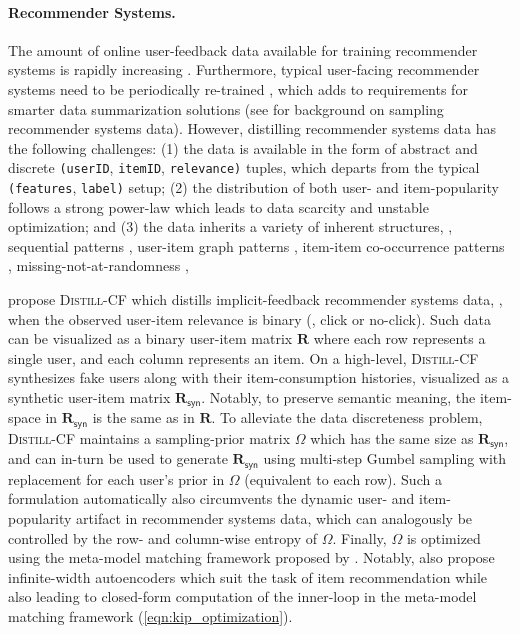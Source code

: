 \documentclass[10pt]{article} %
\begin{document}
\paragraph{Recommender Systems.} The amount of online user-feedback data available for training recommender systems is rapidly increasing \citep{data_increasing_recsys}.
Furthermore, typical user-facing recommender systems need to be periodically re-trained \citep{dlrm}, which adds to requirements for smarter data summarization solutions (see \citet{wsdm22} for background on sampling recommender systems data). However, distilling recommender systems data has the following challenges: (1) the data is available in the form of abstract and discrete \texttt{(userID}, \texttt{itemID}, \texttt{relevance)} tuples, which departs from the typical \texttt{(features}, \texttt{label)} setup; (2) the distribution of both user- and item-popularity follows a strong power-law which leads to data scarcity and unstable optimization; and (3) the data inherits a variety of inherent structures, \eg, sequential patterns \citep{svae, sasrec}, user-item graph patterns \citep{gnn_recsys}, item-item co-occurrence patterns \citep{ease}, missing-not-at-randomness \citep{rec_treatments, def_support}, \etc

\citet{inf_ae} propose \textsc{Distill-CF} which distills implicit-feedback recommender systems data, \ie, when the observed user-item relevance is binary (\eg, click or no-click). Such data can be visualized as a binary user-item matrix $\mathbf{R}$ where each row represents a single user, and each column represents an item. On a high-level, \textsc{Distill-CF} synthesizes fake users along with their item-consumption histories, visualized as a synthetic user-item matrix $\mathbf{R}_{\mathsf{syn}}$. Notably, to preserve semantic meaning, the item-space in $\mathbf{R}_{\mathsf{syn}}$ is the same as in $\mathbf{R}$. To alleviate the data discreteness problem, \textsc{Distill-CF} maintains a sampling-prior matrix $\Omega$ which has the same size as $\mathbf{R}_{\mathsf{syn}}$, and can in-turn be used to generate $\mathbf{R}_{\mathsf{syn}}$ using multi-step Gumbel sampling with replacement \citep{gumbel} for each user's prior in $\Omega$ (equivalent to each row). Such a formulation automatically also circumvents the dynamic user- and item-popularity artifact in recommender systems data, which can analogously be controlled by the row- and column-wise entropy of $\Omega$. Finally, $\Omega$ is optimized using the meta-model matching framework proposed by \citet{kip}. Notably, \citet{inf_ae} also propose infinite-width autoencoders which suit the task of item recommendation while also leading to closed-form computation of the inner-loop in the meta-model matching framework (\cref{eqn:kip_optimization}).
\end{document}
